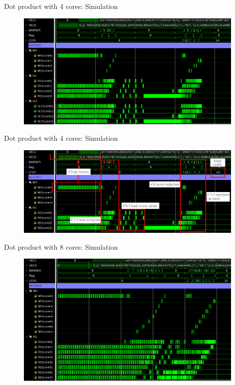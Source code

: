 \begin{frame}{Dot product with 4 cores: Simulation}
\begin{figure}
    \centering
    \includegraphics[width=11cm]{images/axpy_sim4_crop.png}
    \label{fig:my_label}
\end{figure}
\end{frame}

\begin{frame}{Dot product with 4 cores: Simulation}
\begin{figure}
    \centering
    \includegraphics[width=11cm]{images/axpy_sim4_crop_arrow.png}
    \label{fig:my_label}
\end{figure}
\end{frame}

\begin{frame}{Dot product with 8 cores: Simulation}
\begin{figure}
    \centering
    \includegraphics[width=11cm]{images/axpy_sim8_crop.png}
    \label{fig:my_label}
\end{figure}
\end{frame}
